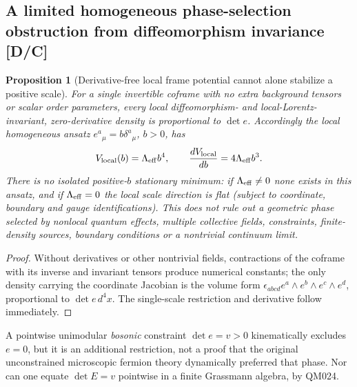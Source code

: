 \documentclass[11pt,a4paper]{article}
\newtheorem{proposition}{Proposition}[section]\newtheorem{lemma}[proposition]{Lemma}\newtheorem{definition}[proposition]{Definition}\newtheorem{remark}[proposition]{Remark}
\begin{document}
\subsection{A limited homogeneous phase-selection obstruction from diffeomorphism invariance [D/C]}
\label{sec:v15-homogeneous}
\begin{proposition}[Derivative-free local frame potential cannot alone stabilize a positive scale]\label{prop:v15-homogeneous}
For a \emph{single invertible} coframe with no extra background tensors or scalar order parameters, every local diffeomorphism- and local-Lorentz-invariant, zero-derivative density is proportional to $\det e$. Accordingly the local homogeneous ansatz $e^a{}_{\mu}=b\delta^a{}_{\mu}$, $b>0$, has
\begin{equation}\label{eq:v15-volume}
V_{\rm local}(b)=\Lambda_{\rm eff}b^4,\qquad
\frac{dV_{\rm local}}{db}=4\Lambda_{\rm eff}b^3.
\end{equation}
There is no isolated positive-$b$ stationary minimum: if $\Lambda_{\rm eff}\ne0$ none exists in this ansatz, and if $\Lambda_{\rm eff}=0$ the local scale direction is flat (subject to coordinate, boundary and gauge identifications). This does not rule out a geometric phase selected by nonlocal quantum effects, multiple collective fields, constraints, finite-density sources, boundary conditions or a nontrivial continuum limit.
\end{proposition}
\begin{proof} Without derivatives or other nontrivial fields, contractions of the coframe with its inverse and invariant tensors produce numerical constants; the only density carrying the coordinate Jacobian is the volume form $\epsilon_{abcd}e^a\wedge e^b\wedge e^c\wedge e^d$, proportional to $\det e\,d^4x$. The single-scale restriction and derivative follow immediately.\end{proof}
A pointwise unimodular \emph{bosonic} constraint $\det e=v>0$ kinematically excludes $e=0$, but it is an additional restriction, not a proof that the original unconstrained microscopic fermion theory dynamically preferred that phase. Nor can one equate $\det E=v$ pointwise in a finite Grassmann algebra, by QM024.
\end{document}

